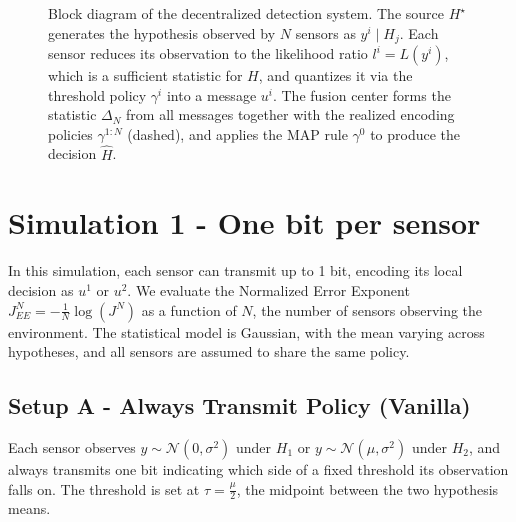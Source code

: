 \documentclass[11pt]{article}
\begin{document}
\begin{figure}[htbp]
{%
    }
\caption{Block diagram of the decentralized detection system. The source $H^\star$ generates the hypothesis observed by $N$ sensors as $y^i \mid H_j$. Each sensor reduces its observation to the likelihood ratio $l^i = L(y^i)$, which is a sufficient statistic for $H$, and quantizes it via the threshold policy $\gamma^i$ into a message $u^i$. The fusion center forms the statistic $\Delta_N$ from all messages together with the realized encoding policies $\gamma^{1:N}$ (dashed), and applies the MAP rule $\gamma^0$ to produce the decision $\hat{H}$.}
\label{fig:system-model}
\end{figure}

\newpage
\section{Simulation 1 - One bit per sensor}
In this simulation, each sensor can transmit up to 1 bit, encoding its local decision as $u^1$ or $u^2$. We evaluate the Normalized Error Exponent $J^N_{EE} = -\frac{1}{N}\log(J^N)$ as a function of $N$, the number of sensors observing the environment. The statistical model is Gaussian, with the mean varying across hypotheses, and all sensors are assumed to share the same policy.
\subsection*{Setup A - Always Transmit Policy (Vanilla)}
Each sensor observes $y \sim \mathcal{N}(0,\sigma^2)$ under $H_1$ or $y \sim \mathcal{N}(\mu,\sigma^2)$ under $H_2$, and always transmits one bit indicating which side of a fixed threshold its observation falls on. The threshold is set at $\tau = \frac{\mu}{2}$, the midpoint between the two hypothesis means.
\end{document}
